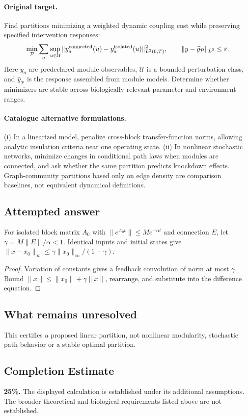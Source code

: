 \documentclass[11pt]{article}
\begin{document}
\paragraph{Original target.}
Find partitions minimizing a weighted dynamic coupling cost while preserving specified intervention responses:
\[\min_{\mathcal P}\sum_a\sup_{u\in\mathcal U}\|y_a^{\rm connected}(u)-y_a^{\rm isolated}(u)\|_{L^2(0,T)}^2,\qquad \|y-\widehat y_{\mathcal P}\|_{L^2}\le\varepsilon.\]
Here $y_a$ are predeclared module observables, $\mathcal U$ is a bounded perturbation class, and $\widehat y_{\mathcal P}$ is the response assembled from module models. Determine whether minimizers are stable across biologically relevant parameter and environment ranges.
\paragraph{Catalogue alternative formulations.}
(i) In a linearized model, penalize cross-block transfer-function norms, allowing analytic insulation criteria near one operating state. (ii) In nonlinear stochastic networks, minimize changes in conditional path laws when modules are connected, and ask whether the same partition predicts knockdown effects. Graph-community partitions based only on edge density are comparison baselines, not equivalent dynamical definitions.
\subsection{Attempted answer}
\begin{proposition}
For isolated block matrix $A_0$ with $\|e^{A_0t}\|\leq Me^{-\alpha t}$ and connection $E$, let $\gamma=M\|E\|/\alpha<1$. Identical inputs and initial states give $\|x-x_0\|_\infty\leq\gamma\|x_0\|_\infty/(1-\gamma)$.
\end{proposition}
\begin{proof}
Variation of constants gives a feedback convolution of norm at most $\gamma$. Bound $\|x\|\leq\|x_0\|+\gamma\|x\|$, rearrange, and substitute into the difference equation.
\end{proof}
\subsection{What remains unresolved}
This certifies a proposed linear partition, not nonlinear modularity, stochastic path behavior or a stable optimal partition.
\subsection{Completion Estimate}
\textbf{25\%.} The displayed calculation is established under its additional assumptions. The broader theoretical and biological requirements listed above are not established.
\end{document}
